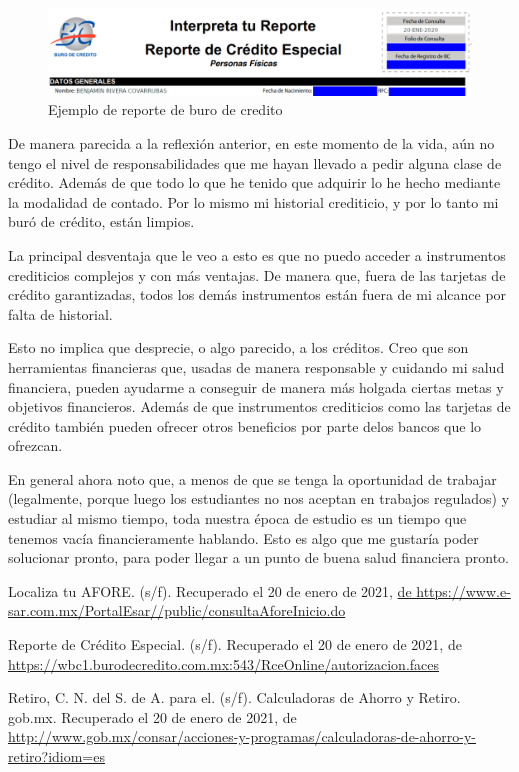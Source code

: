 \documentclass[11pt]{article}
\begin{document}
	\begin{figure}[htp]
		\centering
		\includegraphics[width=\textwidth]{assets/R3_U1-reporte_buro2.png}
		\caption{Ejemplo de reporte de buro de credito}
		\label{}
	\end{figure}
	
	\par De manera parecida a la reflexión anterior, en este momento de la vida, aún no tengo el nivel de responsabilidades que me hayan llevado a pedir alguna clase de crédito. Además de que todo lo que he tenido que adquirir lo he hecho mediante la modalidad de contado. Por lo mismo mi historial crediticio, y por lo tanto mi buró de crédito, están limpios.
	\par La principal desventaja que le veo a esto es que no puedo acceder a instrumentos crediticios complejos y con más ventajas. De manera que, fuera de las tarjetas de crédito garantizadas, todos los demás instrumentos están fuera de mi alcance por falta de historial.
	\par Esto no implica que desprecie, o algo parecido, a los créditos. Creo que son herramientas financieras que, usadas de manera responsable y cuidando mi salud financiera, pueden ayudarme a conseguir de manera más holgada ciertas metas y objetivos financieros. Además de que instrumentos crediticios como las tarjetas de crédito también pueden ofrecer otros beneficios por parte delos bancos que lo ofrezcan.
	
	\par En general ahora noto que, a menos de que se tenga la oportunidad de trabajar (legalmente, porque luego los estudiantes no nos aceptan en trabajos regulados) y estudiar al mismo tiempo, toda nuestra época de estudio es un tiempo que tenemos vacía financieramente hablando. Esto es algo que me gustaría poder solucionar pronto, para poder llegar a un punto de buena salud financiera pronto.




	\begin{thebibliography}{X}
	
		 Localiza tu AFORE. (s/f). Recuperado el 20 de enero de 2021, \url{de https://www.e-sar.com.mx/PortalEsar//public/consultaAforeInicio.do}
		
		 Reporte de Crédito Especial. (s/f). Recuperado el 20 de enero de 2021, de \url{https://wbc1.burodecredito.com.mx:543/RceOnline/autorizacion.faces}

		Retiro, C. N. del S. de A. para el. (s/f). Calculadoras de Ahorro y Retiro. gob.mx. Recuperado el 20 de enero de 2021, de \url{http://www.gob.mx/consar/acciones-y-programas/calculadoras-de-ahorro-y-retiro?idiom=es}
	\end{thebibliography}
\end{document}
